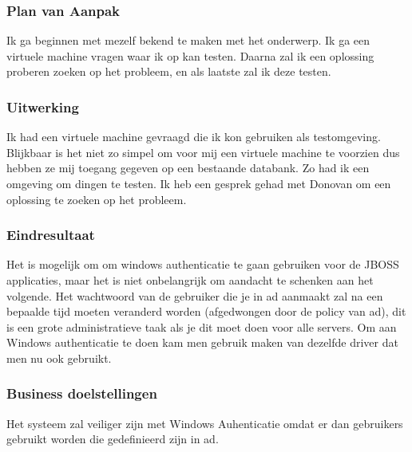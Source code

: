 \subsubsection{Plan van Aanpak}

Ik ga beginnen met mezelf bekend te maken met het onderwerp. Ik ga een virtuele machine vragen waar ik op kan testen. Daarna zal ik een oplossing proberen zoeken op het probleem, en als laatste zal ik deze testen.

\subsubsection{Uitwerking}

Ik had een virtuele machine gevraagd die ik kon gebruiken als testomgeving. Blijkbaar is het niet zo simpel om voor mij een virtuele machine te voorzien dus hebben ze mij toegang gegeven op een bestaande databank. Zo had ik een omgeving om dingen te testen. Ik heb een gesprek gehad met Donovan om een oplossing te zoeken op het probleem.

\subsubsection{Eindresultaat}

Het is mogelijk om om windows authenticatie te gaan gebruiken voor de JBOSS applicaties, maar het is niet onbelangrijk om aandacht te schenken aan het volgende. Het wachtwoord van de gebruiker die je in \gls{ad} aanmaakt zal na een bepaalde tijd moeten veranderd worden (afgedwongen door de policy van \gls{ad}), dit is een grote administratieve taak als je dit moet doen voor alle servers. Om aan Windows authenticatie te doen kam men gebruik maken van dezelfde driver dat men nu ook gebruikt.

\subsubsection{Business doelstellingen}

Het systeem zal veiliger zijn met Windows Auhenticatie omdat er dan gebruikers gebruikt worden die gedefinieerd zijn in \gls{ad}.